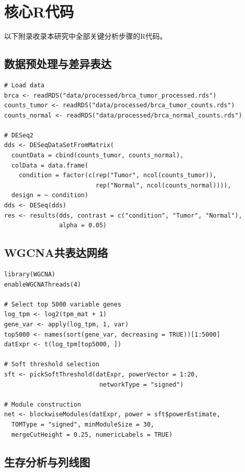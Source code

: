 \documentclass[12pt,a4paper]{ctexart}
\begin{document}
\newpage
\appendix
\section{核心R代码}

以下附录收录本研究中全部关键分析步骤的R代码。

\subsection{数据预处理与差异表达}

\begin{lstlisting}[caption={mRNA数据预处理与DESeq2差异表达}, label={lst:deg}]
# Load data
brca <- readRDS("data/processed/brca_tumor_processed.rds")
counts_tumor <- readRDS("data/processed/brca_tumor_counts.rds")
counts_normal <- readRDS("data/processed/brca_normal_counts.rds")

# DESeq2
dds <- DESeqDataSetFromMatrix(
  countData = cbind(counts_tumor, counts_normal),
  colData = data.frame(
    condition = factor(c(rep("Tumor", ncol(counts_tumor)),
                         rep("Normal", ncol(counts_normal)))),
  design = ~ condition)
dds <- DESeq(dds)
res <- results(dds, contrast = c("condition", "Tumor", "Normal"),
               alpha = 0.05)
\end{lstlisting}

\subsection{WGCNA共表达网络}

\begin{lstlisting}[caption={WGCNA共表达网络构建}, label={lst:wgcna}]
library(WGCNA)
enableWGCNAThreads(4)

# Select top 5000 variable genes
log_tpm <- log2(tpm_mat + 1)
gene_var <- apply(log_tpm, 1, var)
top5000 <- names(sort(gene_var, decreasing = TRUE))[1:5000]
datExpr <- t(log_tpm[top5000, ])

# Soft threshold selection
sft <- pickSoftThreshold(datExpr, powerVector = 1:20,
                          networkType = "signed")

# Module construction
net <- blockwiseModules(datExpr, power = sft$powerEstimate,
  TOMType = "signed", minModuleSize = 30,
  mergeCutHeight = 0.25, numericLabels = TRUE)
\end{lstlisting}

\subsection{生存分析与列线图}
\end{document}
